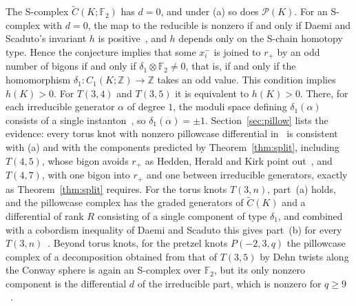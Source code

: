 \documentclass[11pt,reqno]{amsart}
\theoremstyle{plain}
\theoremstyle{definition}
\newcommand{\Z}{\mathbb{Z}}
\newcommand{\tC}{\widetilde C}
\newcommand{\pill}{\mathcal{P}}
\begin{document}
The S-complex $\tC(K;\mathbb F_2)$ has $d=0$, and under (a) so does $\pill(K)$. For an S-complex with
$d=0$, the map to the reducible is nonzero if and only if Daemi and Scaduto's invariant $h$ is
positive~\cite[Prop.~4.15, Rem.~4.2]{DSEquiv}, and $h$ depends only on the S-chain homotopy type. Hence the
conjecture implies that some $x_i^-$ is joined to $r_+$ by an odd number of bigons if and only if
$\delta_1\otimes\mathbb F_2\neq0$, that is, if and only if the homomorphism $\delta_1\colon C_1(K;\Z)\to\Z$
takes an odd value. This condition implies $h(K)>0$. For $T(3,4)$ and $T(3,5)$ it is equivalent to $h(K)>0$. There, for each
irreducible generator $\alpha$ of degree $1$, the moduli space defining $\delta_1(\alpha)$ consists of a single
instanton~\cite[\S9.3, and the same argument in \S9.4]{DSEquiv}, so $\delta_1(\alpha)=\pm1$.
Section~\ref{sec:pillow} lists the evidence: every torus knot with nonzero pillowcase differential
in~\cite{HHK2} is consistent with (a) and with the components predicted by Theorem~\ref{thm:split}, including $T(4,5)$, whose bigon avoids $r_+$ as Hedden, Herald and
Kirk point out~\cite[\S11.8]{HHK2}, and $T(4,7)$, with one bigon into $r_+$ and one between irreducible
generators, exactly as Theorem~\ref{thm:split} requires. For the torus knots $T(3,n)$, part~(a) holds, and the
pillowcase complex has the graded generators of $\tC(K)$ and a differential of rank $R$ consisting of a single
component of type $\delta_1$, and combined with a cobordism inequality of Daemi and Scaduto this gives part~(b) for every
$T(3,n)$~\cite[Thm.~1.3]{Wpill}. Beyond
torus knots, for the pretzel knots $P(-2,3,q)$ the pillowcase complex of a decomposition obtained from that
of $T(3,5)$ by Dehn twists along the Conway sphere is again an S-complex over $\mathbb F_2$, but its only nonzero
component is the differential $d$ of the irreducible part, which is nonzero for $q\ge9$~\cite[Rem.~4.20]{WuebbenII}.
\end{document}

